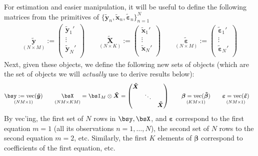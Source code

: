 \documentclass[12pt]{article}
\theoremstyle{plain}
\theoremstyle{definition}
\theoremstyle{remark}
\newcommand{\bsvarepsilon}{\boldsymbol{\varepsilon}}
\newcommand{\bsbeta}{\boldsymbol{\beta}}
\newcommand{\bstildebeta}{\boldsymbol{\tilde{\beta}}}
\newcommand{\bstildey}{\boldsymbol{\tilde{y}}}
\newcommand{\bstildex}{\boldsymbol{\tilde{x}}}
\newcommand{\bstildeX}{\boldsymbol{\tilde{X}}}
\newcommand{\bstildevarepsilon}{\boldsymbol{\tilde{\varepsilon}}}
\newcommand{\vc}{\operatorname{vec}}
\newcommand{\nN}{_{n=1}^N}
\begin{document}
For estimation and easier manipulation, it will be useful to define the
following matrices from the primitives of
$\{\bstildey_n,\bstildex_n,\bstildevarepsilon_n\}\nN$
\begin{align*}
  \underset{(N\times M)}{\bstildey}
  :=
  \begin{pmatrix}
    \bstildey_1' \\
    \vdots\\
    \bstildey_N' \\
  \end{pmatrix}
  \qquad
  \underset{(N\times K)}{\bstildeX}
  :=
  \begin{pmatrix}
    \bstildex_1' \\
    \vdots\\
    \bstildex_N' \\
  \end{pmatrix}
  \qquad
  \underset{(N\times M)}{\bstildevarepsilon}
  :=
  \begin{pmatrix}
    \bstildevarepsilon_1' \\
    \vdots\\
    \bstildevarepsilon_N' \\
  \end{pmatrix}
\end{align*}
Next, given these objects, we define the following new sets of objects
(which are the set of objects we will \emph{actually} use to derive
results below):
\begin{align*}
  \underset{(NM\times 1)}{\bsy := \vc(\bstildey)}
  \qquad
  \underset{(NM\times KM)}{\bsX\vphantom{\bsy:=\vc(\bstildey)}}
  &= \bsI_M \otimes \bstildeX
  =
  \begin{pmatrix}
    \bstildeX  &  &  \\
     &  \ddots &  \\
     &  & \bstildeX \\
  \end{pmatrix}
  \qquad
  \underset{(KM\times 1)}{\bsbeta = \vc(\bstildebeta)\vphantom{\bsy:=\vc(\bstildey)}}
  \qquad
  \underset{(NM\times 1)}{\bsvarepsilon = \vc(\bstildevarepsilon)\vphantom{\bsy:=\vc(\bstildey)}}
\end{align*}
By vec'ing, the first set of $N$ rows in $\bsy,\bsX$, and
$\bsvarepsilon$ correspond to the first equation $m=1$ (all its
observations $n=1,\ldots,N$), the second set of $N$ rows to the second
equation $m=2$, etc. Similarly, the first $K$ elements of $\bsbeta$
correspond to coefficients of the first equation, etc.
\end{document}
